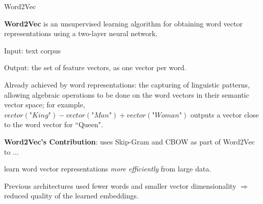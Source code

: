 \begin{frame}{Word2Vec}
    \begin{itemizeSpaced}{10pt}
        \item \textbf{Word2Vec} is an unsupervised learning algorithm for obtaining word vector representations using a two-layer neural network. 
        \begin{itemizeSpaced}{2pt}
            \item Input: text corpus
            \item Output: the set of feature vectors, as one vector per word.
        \end{itemizeSpaced}
        
        \item Already achieved by word representations: the capturing of linguistic patterns, allowing algebraic operations to be done on the word vectors in their semantic vector space; for example, $vector(\textit{"King"}) - vector(\textit{"Man"}) + vector(\textit{"Woman"})$ outputs a vector close to the word vector for ``Queen". 
        
        \item \textbf{Word2Vec's Contribution}: uses Skip-Gram and CBOW as part of Word2Vec to ...
        
        \begin{itemizeSpaced}{2pt}
            \item learn word vector representations \emph{more efficiently} from large data. 
            
            \item Previous architectures used fewer words and smaller vector dimensionality $\Rightarrow$ reduced quality of the learned embeddings. 
        \end{itemizeSpaced}
        
        
    \end{itemizeSpaced}
\end{frame}



